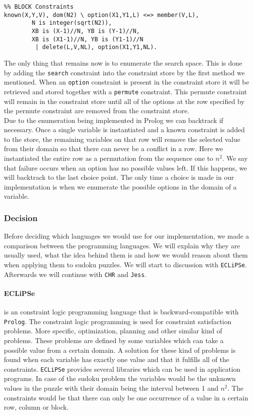 \begin{lstlisting}
%% BLOCK Constraints
known(X,Y,V), dom(N2) \ option(X1,Y1,L) <=> member(V,L),
        N is integer(sqrt(N2)),
        XB is (X-1)//N, YB is (Y-1)//N,
        XB is (X1-1)//N, YB is (Y1-1)//N
         | delete(L,V,NL), option(X1,Y1,NL).
\end{lstlisting}

The only thing that remains now is to enumerate the search space. 
This is done by adding the \texttt{search} constraint into the constraint store by the first method we mentioned.
When an \texttt{option} constraint is present in the constraint store it will be retrieved and stored together with a \texttt{permute} constraint. 
This permute constraint will remain in the constraint store until all of the options at the row specified by the permute constraint are removed from the constraint store. \\

Due to the enumeration being implemented in Prolog we can backtrack if necessary.
Once a single variable is instantiated and a known constraint is added to the store, the remaining variables on that row will remove the selected value from their domain so that there can never be a conflict in a row.
Here we instantiated the entire row as a permutation from the sequence one to $n^2$. 
We say that failure occurs when an option has no possible values left.
If this happens, we will backtrack to the last choice point. 
The only time a choice is made in our implementation is when we enumerate the possible options in the domain of a variable.

\subsubsection{Decision}\label{subsec:sudokudescision}
Before deciding which languages we would use for our implementation, we made a comparison between the programming languages.
We will explain why they are usually used, what the idea behind them is and how we would reason about them when applying them to sudoku puzzles.
We will start to discussion with \texttt{ECLiPSe}. Afterwards we will continue with \texttt{CHR} and \texttt{Jess}.

\paragraph*{ECLiPSe} is an constraint logic programming language that is backward-compatible with \texttt{Prolog}.
The constraint logic programming is used for constraint satisfaction problems.
More specific, optimization, planning and other similar kind of problems.
These problems are defined by some variables which can take a possible value from a certain domain.
A solution for these kind of problems is found when each variable has exactly one value and that it fulfills all of the constraints.
\texttt{ECLiPSe} provides several libraries which can be used in application programs.
In case of the sudoku problem the variables would be the unknown values in the puzzle with their domain being the interval between 1 and $n^2$.
The constraints would be that there can only be one occurrence of a value in a certain row, column or block.

